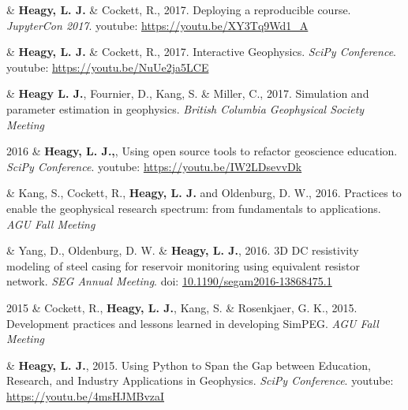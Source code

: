 \documentclass[a4paper, 11pt]{article}
\newcommand{\doi}[1]{doi: \href{https://doi.org/#1}{#1}}
\newcommand{\youtube}[1]{youtube: \href{https://youtu.be/XY3Tq9Wd1\_A}{#1}}
\begin{document}
\begin{entryright}
& \textbf{Heagy, L. J.} \& Cockett, R., 2017. Deploying a reproducible course. \emph{JupyterCon 2017}. \youtube{https://youtu.be/XY3Tq9Wd1\_A}
\end{entryright}

\begin{entryright}
& \textbf{Heagy, L. J.} \& Cockett, R., 2017. Interactive Geophysics. \emph{SciPy Conference}. \youtube{https://youtu.be/NuUe2ja5LCE}
\end{entryright}

\begin{entryright}
& \textbf{Heagy L. J.}, Fournier, D., Kang, S. \& Miller, C., 2017. Simulation and parameter estimation in geophysics. \emph{British Columbia Geophysical Society Meeting}
\end{entryright}

\begin{entryright}
2016 & \textbf{Heagy, L. J.,},  Using open source tools to refactor geoscience education. \emph{SciPy Conference}. \youtube{https://youtu.be/IW2LDsevvDk}
\end{entryright}

\begin{entryright}
& Kang, S., Cockett, R., \textbf{Heagy, L. J.} and Oldenburg, D. W., 2016. Practices to enable the geophysical research spectrum: from fundamentals to applications. \emph{AGU Fall Meeting}
\end{entryright}

\begin{entryright}
& Yang, D., Oldenburg, D. W. \& \textbf{Heagy, L. J.}, 2016. 3D DC resistivity modeling of steel casing for reservoir monitoring using equivalent resistor network. \emph{SEG Annual Meeting}. \doi{10.1190/segam2016-13868475.1}
\end{entryright}

\begin{entryright}
2015 & Cockett, R., \textbf{Heagy, L. J.}, Kang, S. \& Rosenkjaer, G. K., 2015. Development practices and lessons learned in developing SimPEG. \emph{AGU Fall Meeting}
\end{entryright}

\begin{entryright}
& \textbf{Heagy, L. J.}, 2015. Using Python to Span the Gap between Education, Research, and Industry Applications in Geophysics. \emph{SciPy Conference}. \youtube{https://youtu.be/4msHJMBvzaI}
\end{entryright}
\end{document}

